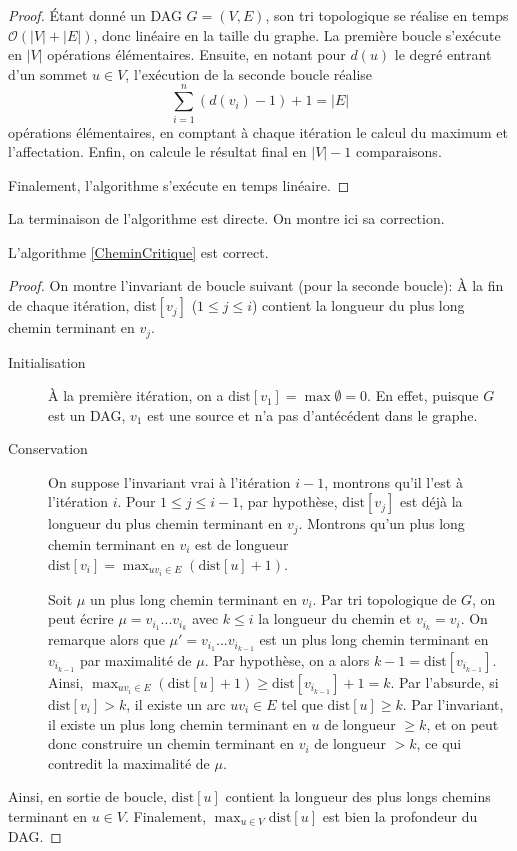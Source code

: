 \begin{proof}
Étant donné un DAG $G=(V,E)$, son tri topologique se réalise en temps $\mathcal{O}(|V|+|E|)$, donc linéaire en la taille du graphe. La première boucle s'exécute en $|V|$ opérations élémentaires. Ensuite, en notant pour $d(u)$ le degré entrant d'un sommet $u\in V$, l'exécution de la seconde boucle réalise 
$$
\sum_{i=1}^n (d(v_i)-1)+1 = |E|
$$
opérations élémentaires, en comptant à chaque itération le calcul du maximum et l'affectation. Enfin, on calcule le résultat final en $|V|-1$ comparaisons.

Finalement, l'algorithme s'exécute en temps linéaire.
\end{proof}


La terminaison de l'algorithme est directe. On montre ici sa correction.

\begin{proposition}
L'algorithme \ref{CheminCritique} est correct.
\end{proposition}

\begin{proof}
On montre l'invariant de boucle suivant (pour la seconde boucle): 
\og À la fin de chaque itération, $\text{dist}[v_j]$ ($1\leq j \leq i$) contient la longueur du plus long chemin terminant en $v_j$. 

\begin{description}
\item[Initialisation] À la première itération, on a $\text{dist}[v_1] = \max \emptyset = 0$. En effet, puisque $G$ est un DAG, $v_1$ est une source et n'a pas d'antécédent dans le graphe.
\item[Conservation] On suppose l'invariant vrai à l'itération $i-1$, montrons qu'il l'est à l'itération $i$. Pour $1\leq j \leq i-1$, par hypothèse, $\text{dist}[v_j]$ est déjà la longueur du plus chemin terminant en $v_j$. Montrons qu'un plus long chemin terminant en $v_i$ est de longueur $\text{dist}[v_i]=\max_{uv_i \in E} (\text{dist}[u]+1)$.

Soit $\mu$ un plus long chemin terminant en $v_i$. Par tri topologique de $G$, on peut écrire $\mu = v_{i_1}...v_{i_k}$ avec $k \leq i$ la longueur du chemin et $v_{i_k} = v_i$. On remarque alors que $\mu' = v_{i_1}...v_{i_{k-1}}$ est un plus long chemin terminant en $v_{i_{k-1}}$ par maximalité de $\mu$. Par hypothèse, on a alors $k-1 = \text{dist}[v_{i_{k-1}}]$. Ainsi, $\max_{uv_i \in E} (\text{dist}[u]+1) \geq  \text{dist}[v_{i_{k-1}}] +1 = k$. Par l'absurde, si $\text{dist}[v_i] > k$, il existe un arc $uv_i \in E$ tel que $\text{dist}[u] \geq k$. Par l'invariant, il existe un plus long chemin terminant en $u$ de longueur $\geq k$, et on peut donc construire un chemin terminant en $v_i$ de longueur $>k$, ce qui contredit la maximalité de $\mu$.
\end{description} 

Ainsi, en sortie de boucle, $\text{dist}[u]$ contient la longueur des plus longs chemins terminant en $u\in V$. Finalement, $\max_{u\in V} \text{dist}[u]$ est bien la profondeur du DAG.
\end{proof}


